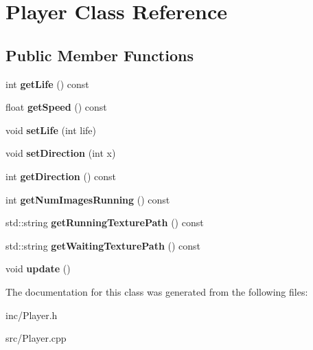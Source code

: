 \hypertarget{class_player}{}\section{Player Class Reference}
\label{class_player}
\subsection*{Public Member Functions}
\begin{DoxyCompactItemize}
\item 
\mbox{\label{class_player_ae3932714817ccfa77a291958c81d90d5}} 
int {\bfseries get\+Life} () const
\item 
\mbox{\label{class_player_a515920b9f3992375f179ca17ee750dc1}} 
float {\bfseries get\+Speed} () const
\item 
\mbox{\label{class_player_aa4f020b28b4de1a78daa5a7ccfc681f1}} 
void {\bfseries set\+Life} (int life)
\item 
\mbox{\label{class_player_ade01a750fde5e4a5d2b2ecbcc2c2d329}} 
void {\bfseries set\+Direction} (int x)
\item 
\mbox{\label{class_player_a6d07a38e20aeda2c583e7d2e3dc20092}} 
int {\bfseries get\+Direction} () const
\item 
\mbox{\label{class_player_a97496998de7051f52172c5d2a4bc41d0}} 
int {\bfseries get\+Num\+Images\+Running} () const
\item 
\mbox{\label{class_player_a6b54149da22e4593a4ce9693c9e1a0b5}} 
std\+::string {\bfseries get\+Running\+Texture\+Path} () const
\item 
\mbox{\label{class_player_aea1d78d1dfa2196f115b29e72ce33427}} 
std\+::string {\bfseries get\+Waiting\+Texture\+Path} () const
\item 
\mbox{\label{class_player_a82c3476f3e65a4e2ac6bcd040771bdd4}} 
void {\bfseries update} ()
\end{DoxyCompactItemize}


The documentation for this class was generated from the following files\+:\begin{DoxyCompactItemize}
\item 
inc/Player.\+h\item 
src/Player.\+cpp\end{DoxyCompactItemize}
